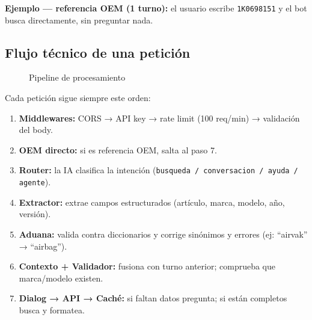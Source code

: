 \documentclass[12pt, a4paper]{article}
\begin{document}
\textbf{Ejemplo — referencia OEM (1 turno):} el usuario escribe \texttt{1K0698151} y el bot busca directamente, sin preguntar nada.

\subsection{Flujo técnico de una petición}

\begin{figure}[h]
\centering
{}
\caption{Pipeline de procesamiento}
\end{figure}

Cada petición sigue siempre este orden:
\begin{enumerate}[noitemsep]
  \item \textbf{Middlewares:} CORS → API key → rate limit (100 req/min) → validación del body.
  \item \textbf{OEM directo:} si es referencia OEM, salta al paso 7.
  \item \textbf{Router:} la IA clasifica la intención (\texttt{busqueda / conversacion / ayuda / agente}).
  \item \textbf{Extractor:} extrae campos estructurados (artículo, marca, modelo, año, versión).
  \item \textbf{Aduana:} valida contra diccionarios y corrige sinónimos y errores (ej: ``airvak'' → ``airbag'').
  \item \textbf{Contexto + Validador:} fusiona con turno anterior; comprueba que marca/modelo existen.
  \item \textbf{Dialog → API → Caché:} si faltan datos pregunta; si están completos busca y formatea.
\end{enumerate}
\end{document}
